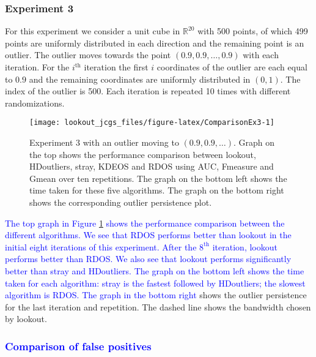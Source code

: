 \documentclass[12pt]{article}
\theoremstyle{definition}
\theoremstyle{definition}
\theoremstyle{definition}
\theoremstyle{definition}
\theoremstyle{remark}
\begin{document}
\hypertarget{experiment-3}{%
\subsubsection*{Experiment 3}\label{experiment-3}}

For this experiment we consider a unit cube in \(\mathbb{R}^{20}\) with 500 points, of which 499 points are uniformly distributed in each direction and the remaining point is an outlier. The outlier moves towards the point \(\left( 0.9, 0.9, \dots, 0.9 \right)\) with each iteration. For the \(i^{\text{th}}\) iteration the first \(i\) coordinates of the outlier are each equal to \(0.9\) and the remaining coordinates are uniformly distributed in \((0,1)\). The index of the outlier is 500. Each iteration is repeated 10 times with different randomizations.

\begin{figure}
\texttt{[image: lookout\_jcgs\_files/figure-latex/ComparisonEx3-1]} \caption{Experiment 3 with an outlier moving to $(0.9, 0.9, \dots)$. Graph on the top shows the performance comparison between lookout, HDoutliers, stray, KDEOS and RDOS using AUC, Fmeasure and Gmean over ten repetitions. The graph on the bottom left shows the time taken for these five algorithms. The graph on the bottom right shows the corresponding outlier persistence plot.}\label{fig:ComparisonEx3}
\end{figure}

\textcolor{blue}{The top graph in Figure \ref{fig:ComparisonEx3} shows the performance comparison between the different algorithms. We see that RDOS performs better than lookout in the initial eight iterations of this experiment. After the $8^{\text{th}}$ iteration, lookout performs better than RDOS. We also see that lookout performs significantly better than stray and HDoutliers. The graph on the bottom left shows the time taken for each algorithm: stray is the fastest followed by HDoutliers; the slowest algorithm is RDOS. The graph in the bottom right} shows the outlier persistence for the last iteration and repetition. The dashed line shows the bandwidth chosen by lookout.

\hypertarget{section}{%
\subsubsection*{\texorpdfstring{\textcolor{blue}{Comparison of false positives }}{}}\label{section}}
\end{document}
